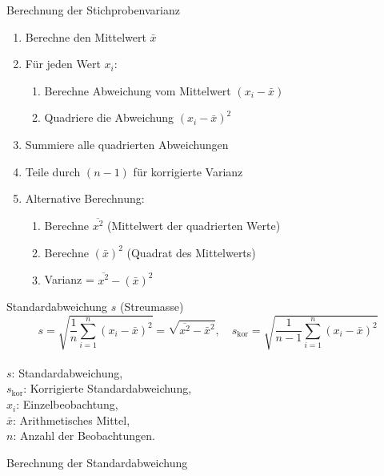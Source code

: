 \begin{KR}{Berechnung der Stichprobenvarianz}
\begin{enumerate}
    \item Berechne den Mittelwert $\bar{x}$
    \item Für jeden Wert $x_i$:
        \begin{enumerate}
            \item Berechne Abweichung vom Mittelwert $(x_i - \bar{x})$
            \item Quadriere die Abweichung $(x_i - \bar{x})^2$
        \end{enumerate}
    \item Summiere alle quadrierten Abweichungen
    \item Teile durch $(n-1)$ für korrigierte Varianz
    \item Alternative Berechnung:
        \begin{enumerate}
            \item Berechne $\overline{x^2}$ (Mittelwert der quadrierten Werte)
            \item Berechne $(\bar{x})^2$ (Quadrat des Mittelwerts)
            \item Varianz = $\overline{x^2} - (\bar{x})^2$
        \end{enumerate}
\end{enumerate}
\end{KR}

\begin{definition}{Standardabweichung $s$ (Streumasse)}\\
$$
s=\sqrt{\frac{1}{n} \sum_{i=1}^{n}\left(x_{i}-\bar{x}\right)^{2}}=\sqrt{\overline{x^{2}}-\bar{x}^{2}}, \quad s_{\text{kor}}=\sqrt{\frac{1}{n-1} \sum_{i=1}^{n}\left(x_{i}-\bar{x}\right)^{2}}
$$
\\
$s$: Standardabweichung, \\
$s_{\text{kor}}$: Korrigierte Standardabweichung, \\
$x_{i}$: Einzelbeobachtung, \\
$\bar{x}$: Arithmetisches Mittel, \\
$n$: Anzahl der Beobachtungen.
\end{definition}

\begin{KR}{Berechnung der Standardabweichung}
\end{KR}

